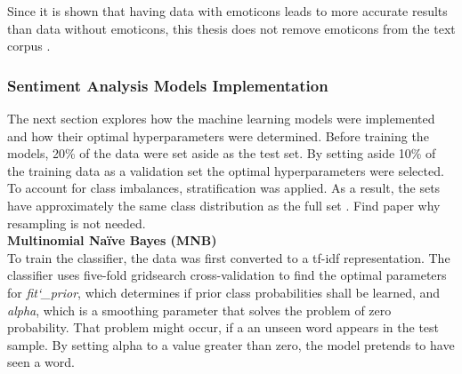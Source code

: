 \documentclass[11pt, a4paper]{article}
\begin{document}
Since it is shown that having data with emoticons leads to more accurate results than data without emoticons,
this thesis does not remove emoticons from the text corpus \citep{parveen2016sentimentanalysistwitter}.

\subsubsection{Sentiment Analysis Models Implementation}
The next section explores how the machine learning models were implemented and how their optimal hyperparameters were determined.
Before training the models, 20\% of the data were set aside as the test set. By setting aside 10\% of the training data as a validation set 
the optimal hyperparameters were selected. To account for class imbalances, stratification was applied. As a result, the sets have approximately the same
class distribution as the full set \citep{sahu2017stratification}. Find paper why resampling is not needed. \\

\noindent\textbf{Multinomial Naïve Bayes (MNB)}\\
To train the classifier, the data was first converted to a tf-idf representation.
The classifier uses five-fold gridsearch cross-validation to find the optimal parameters for
\emph{fit\char`_prior}, which determines if prior class probabilities shall be learned, and \emph{alpha}, which is a smoothing parameter that solves
the problem of zero probability. That problem might occur, if a an unseen word appears in the test sample. By setting alpha to a value greater than
zero, the model pretends to have seen a word.\\
\end{document}

